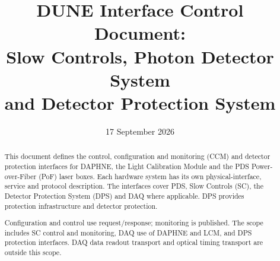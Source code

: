 \documentclass{cernatlasnote}
\title{DUNE Interface Control Document:\\Slow Controls, Photon Detector System\\and Detector Protection System}
\author{}
\date{17 September 2026}
\begin{document}
\maketitle
\begin{abstract}
This document defines the control, configuration and monitoring (CCM) and
detector protection interfaces for DAPHNE, the Light Calibration Module and the PDS Power-over-Fiber
(PoF) laser boxes. Each hardware system has its own physical-interface,
service and protocol description. The interfaces cover PDS, Slow Controls (SC),
the Detector Protection System (DPS) and DAQ where applicable. DPS provides
protection infrastructure and detector protection.

Configuration and control use request/response; monitoring is published.
The scope includes SC control and monitoring, DAQ use of DAPHNE and LCM,
and DPS protection interfaces.
DAQ data readout transport and optical timing transport are outside this scope.
\end{abstract}
\vfill
\makereviewtable
\clearpage




\clearpage

\clearpage

\end{document}

